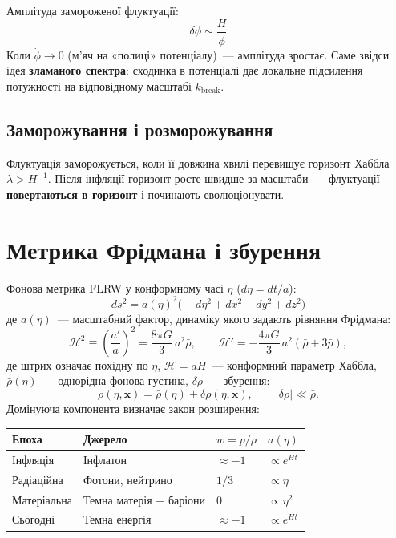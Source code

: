 \documentclass[12pt, a4paper]{article}
\begin{document}
Амплітуда замороженої флуктуації:
\[
  \delta\phi \sim \frac{H}{\dot{\phi}}
\]
Коли $\dot{\phi} \to 0$ (м'яч на «полиці» потенціалу)~--- амплітуда зростає.
Саме звідси ідея \textbf{зламаного спектра}: сходинка в потенціалі дає
локальне підсилення потужності на відповідному масштабі $k_\mathrm{break}$.

\subsection{Заморожування і розморожування}

Флуктуація заморожується, коли її довжина хвилі перевищує горизонт Хаббла
$\lambda > H^{-1}$. Після інфляції горизонт росте швидше за масштаби~---
флуктуації \textbf{повертаються в горизонт} і починають еволюціонувати.

\section{Метрика Фрідмана і збурення}

Фонова метрика FLRW у конформному часі $\eta$ ($d\eta = dt/a$):
\[
  ds^2 = a(\eta)^2\bigl(-d\eta^2 + dx^2 + dy^2 + dz^2\bigr)
\]
де $a(\eta)$~--- масштабний фактор, динаміку якого задають рівняння Фрідмана:
\[
  \mathcal{H}^2 \equiv \left(\frac{a'}{a}\right)^2 = \frac{8\pi G}{3}\,a^2\bar{\rho},
  \qquad
  \mathcal{H}' = -\frac{4\pi G}{3}\,a^2(\bar{\rho} + 3\bar{p}),
\]
де штрих означає похідну по $\eta$, $\mathcal{H} = aH$~---
конформний параметр Хаббла, $\bar{\rho}(\eta)$~--- однорідна фонова густина, $\delta\rho$~--- збурення:
\[
  \rho(\eta, \mathbf{x}) = \bar{\rho}(\eta) + \delta\rho(\eta, \mathbf{x}),
  \qquad |\delta\rho| \ll \bar{\rho}.
\]
Домінуюча компонента визначає закон розширення:

\begin{center}
\begin{tabular}{llll}
\toprule
Епоха & Джерело & $w = p/\rho$ & $a(\eta)$ \\
\midrule
Інфляція     & Інфлатон                & $\approx -1$ & $\propto e^{Ht}$ \\
Радіаційна   & Фотони, нейтрино        & $1/3$        & $\propto \eta$ \\
Матеріальна  & Темна матерія + баріони & $0$          & $\propto \eta^2$ \\
Сьогодні     & Темна енергія           & $\approx -1$ & $\propto e^{Ht}$ \\
\bottomrule
\end{tabular}
\end{center}
\end{document}
